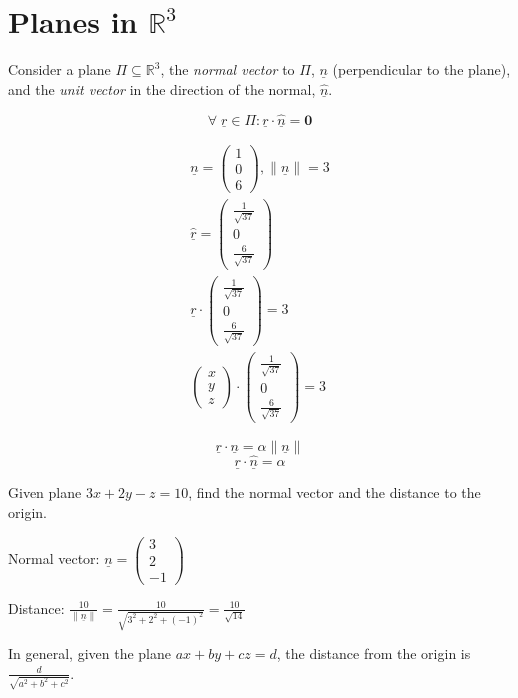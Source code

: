 \documentclass[00_complete]{subfiles}
\begin{document}
\section{Planes in \texorpdfstring{$\mathbb{R}^3$}{R3}}

Consider a plane $\Pi \subseteq \mathbb{R}^3$, the \emph{normal vector} to $\Pi$,
$\underline n$ (perpendicular to the plane), and the \emph{unit vector} in the direction of the normal,
$\underline{\hat n}$.

$$\forall \; \underline r \in \Pi : \underline r \cdot
\underline{\hat n} = \mathbf 0$$

\begin{example}

$$
\begin{gathered}
    \underline n = \begin{pmatrix}
        1\\0\\6
    \end{pmatrix}, \|\underline n\| = 3 \\
    \underline{\hat r} = \begin{pmatrix}
        \frac{1}{\sqrt{37}} \\
        0 \\
        \frac{6}{\sqrt{37}}
    \end{pmatrix} \\
    \underline r \cdot \begin{pmatrix}
        \frac{1}{\sqrt{37}} \\
        0 \\
        \frac{6}{\sqrt{37}}
    \end{pmatrix} = 3 \\
    \begin{pmatrix}
        x\\y\\z
    \end{pmatrix} \cdot \begin{pmatrix}
        \frac{1}{\sqrt{37}} \\
        0 \\
        \frac{6}{\sqrt{37}}
    \end{pmatrix} = 3
\end{gathered}
$$

$$\underline r \cdot \underline n = \alpha \|\underline n\|$$
$$\underline r \cdot \underline{\hat n} = \alpha$$

Given plane $3x+2y-z=10$, find the normal vector and the distance to the
origin.

Normal vector: $\underline n = \begin{pmatrix}
    3\\2\\-1
\end{pmatrix}$

Distance: $\frac{10}{\|\underline n\|} = \frac{10}{\sqrt{3^2+2^2+(-1)^2}} = \frac{10}{\sqrt{14}}$

\end{example}
In general, given the plane $ax+by+cz = d$, the distance from the origin is $\frac{d}{\sqrt{a^2+b^2+c^2}}$.
\end{document}
